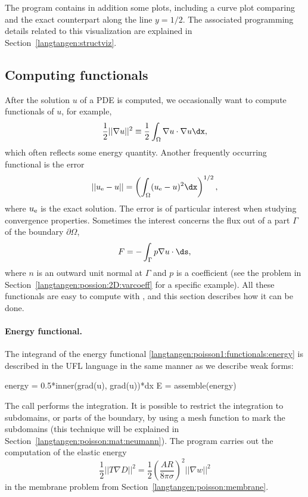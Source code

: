 The program  contains in
addition some plots, including a curve plot comparing
 and the exact counterpart along
the line $y=1/2$.  The associated programming details related to this
visualization are explained in Section~\ref{langtangen:structviz}.

\subsection{Computing functionals}
\label{langtangen:poisson1:functionals}

After the solution $u$ of a PDE is computed, we occasionally want to compute
functionals of $u$, for example,
\begin{equation}
  \frac{1}{2} ||\nabla u||^2 \equiv \frac{1}{2}\int_\Omega \nabla u\cdot \nabla u\dx,
\label{langtangen:poisson1:functionals:energy}
\end{equation}
which often reflects some energy quantity.  Another frequently
occurring functional is the error
\begin{equation}
  ||u_{\rm e}-u|| = \left(\int_\Omega (u_{\rm e}-u)^2\dx\right)^{1/2},
\label{langtangen:poisson1:functionals:error}
\end{equation}
where $u_{\rm e}$ is the exact solution. The error
is of particular interest when studying convergence properties.
Sometimes the interest concerns the flux out of a part $\Gamma$ of the
boundary $\partial\Omega$,
\begin{equation}
  F = -\int_\Gamma p\nabla u\cdot  \ds,
\label{langtangen:poisson1:functionals:flux}
\end{equation}
where $n$ is an outward unit normal
at $\Gamma$ and $p$ is a coefficient (see the problem in
Section~\ref{langtangen:possion:2D:varcoeff} for a specific example).
All these functionals are easy to compute with \fenics, and this section
describes how it can be done.

\paragraph{Energy functional.}
The integrand of the energy functional
\eqref{langtangen:poisson1:functionals:energy} is described in the UFL
language in the same manner as we describe weak forms:
\begin{python}
energy = 0.5*inner(grad(u), grad(u))*dx
E = assemble(energy)
\end{python}
The  call performs the integration.  It is possible to
restrict the integration to subdomains, or parts of the boundary,
by using a mesh function to mark the subdomains (this technique will be
explained
in Section~\ref{langtangen:poisson:mat:neumann}).  The program
 carries out the computation of the elastic energy
\begin{equation}
   \frac{1}{2}||T\nabla D||^2 = \frac{1}{2}\left(\frac{AR}{8\pi\sigma}\right)^2
    ||\nabla w||^2
\end{equation}
in the membrane problem from Section~\ref{langtangen:poisson:membrane}.

